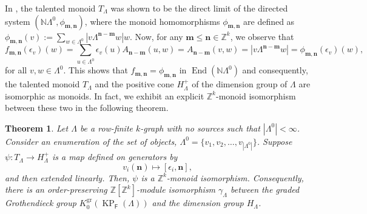 \documentclass[12pt]{amsart}
\newcommand{\N}{\mathbf{n}}
\newcommand{\M}{\mathbf{m}}
\newcommand{\KP}{\operatorname{KP}}
\newtheorem{thm}{Theorem}[section]
\theoremstyle{definition}
\theoremstyle{remark}
\newcommand{\End}{\operatorname{End}}
\newcommand{\gr}{\operatorname{gr}}
\begin{document}
In \cite[Proposition 3.14]{HMPS}, the talented monoid $T_\Lambda$ was shown to be the direct limit of the directed system $(\mathbb{N}\Lambda^0,\phi_{\M,\N})$, where the monoid homomorphisms $\phi_{\M,\N}$ are defined as $\phi_{\M,\N}(v):=\displaystyle{\sum_{w\in \Lambda^0}} |v\Lambda^{\N-\M}w| w$. Now, for any $\M\le \N\in \mathbb{Z}^k$, we observe that \[f_{\M,\N}(\epsilon_v)(w)=\displaystyle{\sum_{u\in \Lambda^0}} \epsilon_v(u)A_{\N-\M}(u,w)=A_{\N-\M}(v,w)=|v\Lambda^{\N-\M}w|=\phi_{\M,\N}(\epsilon_v)(w),\] for all $v,w\in \Lambda^0$. This shows that $f_{\M,\N}=\phi_{\M,\N}$ in $\End(\mathbb{N}\Lambda^0)$ and consequently, the talented monoid $T_\Lambda$ and the positive cone $H_\Lambda^+$ of the dimension group of $\Lambda$ are isomorphic as monoids. In fact, we exhibit an explicit $\mathbb{Z}^k$-monoid isomorphism between these two in the following theorem.

\begin{thm}\label{th isomorphism of talented monoid and dimension semigroup}
Let $\Lambda$ be a row-finite $k$-graph with no sources such that $|\Lambda^0|< \infty$. Consider an enumeration of the set of objects, $\Lambda^0=\{v_1,v_2,\ldots,v_{|\Lambda^0|}\}$. Suppose $\psi:T_\Lambda\longrightarrow H_\Lambda^+$ is a map defined on generators by
\[v_i(\N)\longmapsto [\epsilon_i,\N],\]
and then extended linearly. Then, $\psi$ is a $\mathbb{Z}^k$-monoid isomorphism. Consequently, there is an order-preserving $\mathbb{Z}[\mathbb{Z}^k]$-module isomorphism $\gamma_\Lambda$ between the graded Grothendieck group $K_0^{\gr}(\KP_{\mathsf{F}}(\Lambda))$ and the dimension group $H_\Lambda$.
\end{thm}
\end{document}

